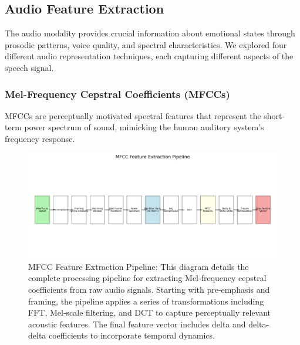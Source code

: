 \documentclass[12pt]{article}
\begin{document}
\subsection{Audio Feature Extraction}
The audio modality provides crucial information about emotional states through prosodic patterns, voice quality, and spectral characteristics. We explored four different audio representation techniques, each capturing different aspects of the speech signal.

\subsubsection{Mel-Frequency Cepstral Coefficients (MFCCs)}
MFCCs are perceptually motivated spectral features that represent the short-term power spectrum of sound, mimicking the human auditory system's frequency response.

\begin{figure}[h]
    \centering
    \includegraphics[width=1.0\linewidth]{Figures/mfcc_pipeline.png}
    \caption{MFCC Feature Extraction Pipeline: This diagram details the complete processing pipeline for extracting Mel-frequency cepstral coefficients from raw audio signals. Starting with pre-emphasis and framing, the pipeline applies a series of transformations including FFT, Mel-scale filtering, and DCT to capture perceptually relevant acoustic features. The final feature vector includes delta and delta-delta coefficients to incorporate temporal dynamics.}
    \label{fig:mfcc_pipeline}
\end{figure}
\end{document}
